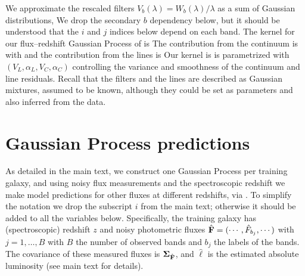 \documentclass[aps,prd,showpacs,superscriptaddress,groupedaddress]{revtex4}  %
\begin{document}
We approximate the rescaled filters $V_b(\lambda) = W_b(\lambda)/\lambda$ as a sum of Gaussian distributions,
We drop the secondary $b$ dependency below, but it should be understood that the $i$ and $j$ indices below depend on each band.
The kernel for our flux--redshift Gaussian Process of  is
The contribution from the continuum is
with
and the contribution from the lines is
Our kernel is is parametrized with $(V_L,  \alpha_L, V_C, \alpha_C)$ controlling the variance and smoothness of the continuum and line residuals. Recall that the filters and the lines are described as Gaussian mixtures, assumed to be known, although they could be set as parameters and also inferred from the data.


\section{Gaussian Process predictions}\label{sec:gppred}

As detailed in the main text, we construct one Gaussian Process per training galaxy, and using noisy flux measurements and the spectroscopic redshift we make model predictions for other fluxes at different redshifts, via . 
To simplify the notation we drop the subscript $i$ from the main text; otherwise it should be added to all the variables below.
Specifically, the training galaxy has (spectroscopic) redshift $z$ and noisy photometric fluxes $\hat{\mat{F}} = (\cdots, \hat{F}_{b_j}, \cdots)$ with $j=1, \dots, B$ with $B$ the number of observed bands and $b_j$ the labels of the bands. 
The covariance of these measured fluxes is $\mat{\Sigma}_{\hat{\mat{F}}}$, and $\hat{\ell}$ is the estimated absolute luminosity (see main text for details).
\end{document}
